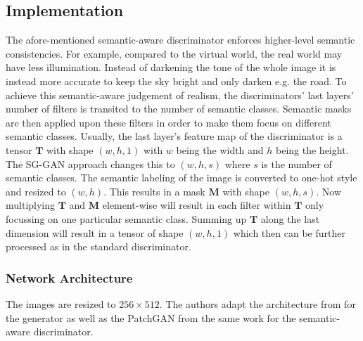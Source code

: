 \subsection{Implementation}
The afore-mentioned semantic-aware discriminator enforces higher-level semantic consistencies. For example, compared to the virtual world, the real world may have less illumination. Instead of darkening the tone of the whole image it is instead more accurate to keep the sky bright and only darken e.g. the road. To achieve this semantic-aware judgement of realism, the discriminators' last layers' number of filters is transited to the number of semantic classes. Semantic masks are then applied upon these filters in order to make them focus on different semantic classes. Usually, the last layer's feature map of the discriminator is a tensor $\mathbf{T}$ with shape $(w,h,1)$ with $w$ being the width and $h$ being the height. The SG-GAN approach changes this to $(w,h,s)$ where $s$ is the number of semantic classes. The semantic labeling of the image is converted to one-hot style and resized to $(w,h)$. This results in a mask $\mathbf{M}$ with shape $(w,h,s)$. Now multiplying $\mathbf{T}$ and $\mathbf{M}$ element-wise will result in each filter within $\mathbf{T}$ only focussing on one particular semantic class. Summing up $\mathbf{T}$ along the last dimension will result in a tensor of shape $(w,h,1)$ which then can be further processed as in the standard discriminator. 

\subsubsection{Network Architecture}
The images are resized to $256 \times 512$. The authors adapt the architecture from \cite{DBLP:journals/corr/IsolaZZE16} for the generator as well as the PatchGAN from the same work for the semantic-aware discriminator. 


